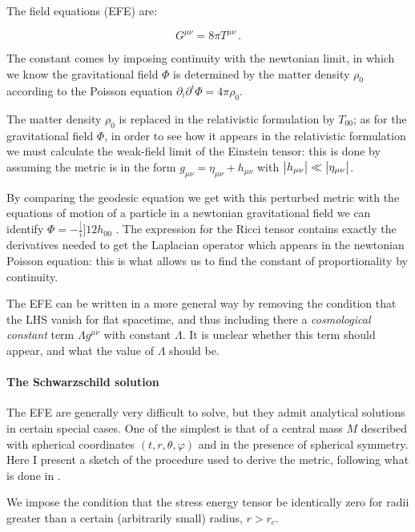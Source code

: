 \documentclass[main.tex]{subfiles}
\begin{document}
The field equations (EFE) are:

\begin{equation} \label{eq:EFE}
  G^{\mu\nu} = 8 \pi T^{\mu\nu} \,.
\end{equation}

The constant comes by imposing continuity with the newtonian limit, in which we know the gravitational field \(\Phi\) is determined by the matter density \(\rho_0\) according to the Poisson equation \(\partial_i \partial^i \Phi = 4 \pi \rho_0\).

The matter density \(\rho_0\) is replaced in the relativistic formulation by \(T_{00}\); as for the gravitational field \(\Phi\), in order to see how it appears in the relativistic formulation we must calculate the weak-field limit of the Einstein tensor: this is done by assuming the metric is in the form \(g_{\mu \nu} = \eta_{\mu\nu} + h_{\mu\nu}\) with \(\abs{h_{\mu\nu}} \ll \abs{\eta_{\mu\nu}}\).

By comparing the geodesic equation we get with this perturbed metric with the equations of motion of a particle in a newtonian gravitational field we can identify \(\Phi = -\frac[i]{1}{2} h_{00}\) \cite[eq. 4.20]{Carroll:1997ar}.
The expression for the Ricci tensor contains exactly the derivatives needed to get the Laplacian operator which appears in the newtonian Poisson equation: this is what allows us to find the constant of proportionality by continuity.

The EFE can be written in a more general way by removing the condition that the LHS vanish for flat spacetime, and thus including there a \emph{cosmological constant}  term \(\Lambda g^{\mu\nu}\) with constant \(\Lambda\).
It is unclear whether this term should appear, and what the value of \(\Lambda\) should be.

\paragraph{The Schwarzschild solution}


The EFE are generally very difficult to solve, but they admit analytical solutions in certain special cases.
One of the simplest is that of a central mass \(M\) described with spherical coordinates \((t, r, \theta, \varphi)\) and in the presence of spherical symmetry. Here I present a sketch of the procedure used to derive the metric, following what is done in \textcite[section 7]{Carroll:1997ar}.

We impose the condition that the stress energy tensor be identically zero for radii greater than a certain (arbitrarily small) radius, \(r > r_c\).
\end{document}
